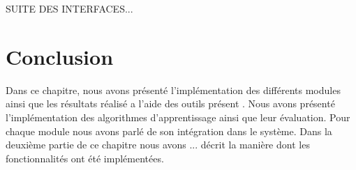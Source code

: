 SUITE DES INTERFACES...




\section{Conclusion}

Dans ce chapitre, nous avons présenté l'implémentation des différents modules ainsi que les résultats réalisé a l'aide des outils présent . Nous avons présenté l'implémentation des algorithmes d'apprentissage ainsi que leur évaluation. Pour chaque module nous avons parlé de son intégration dans le système. Dans la deuxième partie de ce chapitre nous avons ... décrit la manière dont les
fonctionnalités ont été implémentées. 